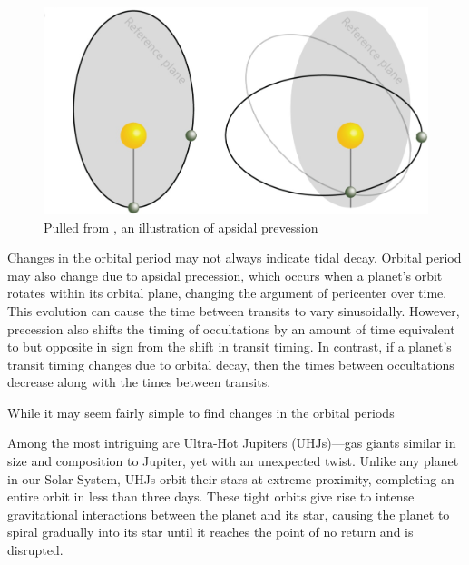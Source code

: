 \documentclass[oneside,12pt]{amsart}
\numberwithin{page}{section}
\begin{document}
\begin{figure}
    \centering
    \includegraphics[width=\linewidth]{figs/precession.jpg}
    \caption{Pulled from \citet{vervoort2022system}, an illustration of apsidal prevession }
    \label{fig:enter-label}
\end{figure}

Changes in the orbital period may not always indicate tidal decay. Orbital period may also change due to apsidal precession, which occurs when a planet's orbit rotates within its orbital plane, changing the argument of pericenter over time. This evolution can cause the time between transits to vary sinusoidally. However, precession also shifts the timing of occultations by an amount of time equivalent to but opposite in sign from the shift in transit timing. In contrast, if a planet's transit timing changes due to orbital decay, then the times between occultations decrease along with the times between transits.

While it may seem fairly simple to find changes in the orbital periods 



\clearpage

Among the most intriguing are Ultra-Hot Jupiters (UHJs)—gas giants similar in size and composition to Jupiter, yet with an unexpected twist. Unlike any planet in our Solar System, UHJs orbit their stars at extreme proximity, completing an entire orbit in less than three days. These tight orbits give rise to intense gravitational interactions between the planet and its star, causing the planet to spiral gradually into its star until it reaches the point of no return and is disrupted. 
\end{document}
